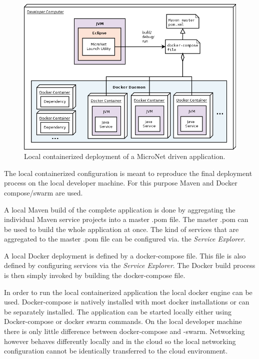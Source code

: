 \begin{figure}
	\centering
	\includegraphics[width=\textwidth]{images/architecture/DeploymentLocalContainerized}
	\caption{Local containerized deployment of a MicroNet driven application.}
	\label{fig:deployment_local_containerized}
\end{figure}

The local containerized configuration is meant to reproduce the final deployment
process on the local developer machine. For this purpose Maven and Docker
compose/swarm are used. 

A local Maven build of the complete application is done by aggregating the
individual Maven service projects into a master .pom file. The master .pom can
be used to build the whole application at once. The kind of services that are
aggregated to the master .pom file can be configured via. the \textit{Service Explorer}.

A local Docker deployment is defined by a docker-compose file. This file is also
defined by configuring services via the \textit{Service Explorer}. The Docker build
process is then simply invoked by building the docker-compose file.

In order to run the local containerized application the local docker engine can
be used. Docker-compose is natively installed with most docker installations or
can be separately installed. The application can be started locally either using
Docker-compose or docker swarm commands. On the local developer machine there is
only little difference between docker-compose and -swarm. Networking however
behaves differently locally and in the cloud so the local networking
configuration cannot be identically transferred to the cloud environment.

